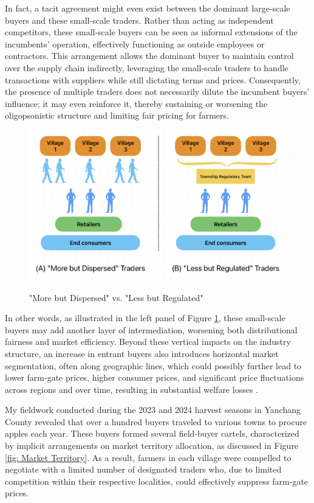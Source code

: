 In fact, a tacit agreement might even exist between the dominant large-scale buyers and these small-scale traders. Rather than acting as independent competitors, these small-scale buyers can be seen as informal extensions of the incumbents' operation, effectively functioning as outside employees or contractors. This arrangement allows the dominant buyer to maintain control over the supply chain indirectly, leveraging the small-scale traders to handle transactions with suppliers while still dictating terms and prices. Consequently, the presence of multiple traders does not necessarily dilute the incumbent buyers' influence; it may even reinforce it, thereby sustaining or worsening the oligopsonistic structure and limiting fair pricing for farmers.

\begin{figure}[hpt]
    \centering
        \caption{"More but Dispersed" vs. "Less but Regulated"}
    \includegraphics[width=\linewidth]{figures/more_is_less.png}
    \label{fig: more is less}
\end{figure}

In other words, as illustrated in the left panel of Figure \ref{fig: more is less}, these small-scale buyers may add another layer of intermediation, worsening both distributional fairness and market efficiency. Beyond these vertical impacts on the industry structure, an increase in entrant buyers also introduces horizontal market segmentation, often along geographic lines, which could possibly further lead to lower farm-gate prices, higher consumer prices, and significant price fluctuations across regions and over time, resulting in substantial welfare losses \citep{bergquist_McIntosh_2024}.


My fieldwork conducted during the 2023 and 2024 harvest seasons in Yanchang County revealed that over a hundred buyers traveled to various towns to procure apples each year. These buyers formed several field-buyer cartels, characterized by implicit arrangements on market territory allocation, as discussed in Figure \ref{fig: Market Territory}. As a result, farmers in each village were compelled to negotiate with a limited number of designated traders who, due to limited competition within their respective localities, could effectively suppress farm-gate prices.

